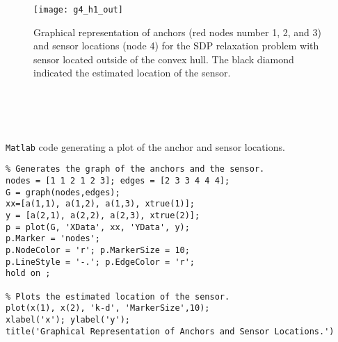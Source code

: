 \documentclass[12pt,letterpaper]{article}
\begin{document}
\begin{figure}[t]
\begin{center}
\texttt{[image: g4\_h1\_out]}
\end{center}
\caption{Graphical representation of anchors (red nodes number 1, 2, and 3) and sensor locations (node 4) for the SDP relaxation problem with sensor located outside of the convex hull. The black diamond indicated the estimated location of the sensor.}
\end{figure}

~\\
~\\
~\\
\begin{center}
\texttt{Matlab} code generating a plot of the anchor and sensor locations.  
\end{center}
\begin{lstlisting}
% Generates the graph of the anchors and the sensor.
nodes = [1 1 2 1 2 3]; edges = [2 3 3 4 4 4];
G = graph(nodes,edges);
xx=[a(1,1), a(1,2), a(1,3), xtrue(1)];
y = [a(2,1), a(2,2), a(2,3), xtrue(2)];
p = plot(G, 'XData', xx, 'YData', y);
p.Marker = 'nodes';
p.NodeColor = 'r'; p.MarkerSize = 10;
p.LineStyle = '-.'; p.EdgeColor = 'r';
hold on ;

% Plots the estimated location of the sensor. 
plot(x(1), x(2), 'k-d', 'MarkerSize',10);
xlabel('x'); ylabel('y');
title('Graphical Representation of Anchors and Sensor Locations.')
\end{lstlisting}
\end{document}
